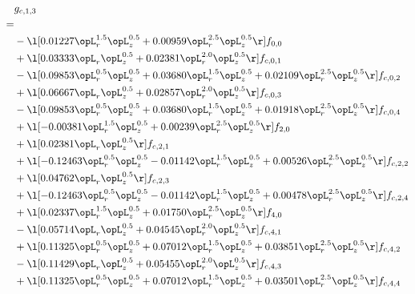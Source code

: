 \begin{alignat}{2} 
\label{eq:g_13_0} 
& g_{c,1,3} \nonumber \\ 
 = \\ 
& - \l[  0.01227 \opL_r^{1.5} \opL_z^{0.5} +  0.00959 \opL_r^{2.5} \opL_z^{0.5}  \r] f_{0,0} \nonumber \\ 
& + \l[  0.03333 \opL_r \opL_z^{0.5} +  0.02381 \opL_r^{2.0} \opL_z^{0.5}  \r] f_{c,0,1} \nonumber \\ 
& - \l[  0.09853 \opL_r^{0.5} \opL_z^{0.5} +  0.03680 \opL_r^{1.5} \opL_z^{0.5} +  0.02109 \opL_r^{2.5} \opL_z^{0.5}  \r] f_{c,0,2} \nonumber \\ 
& + \l[  0.06667 \opL_r \opL_z^{0.5} +  0.02857 \opL_r^{2.0} \opL_z^{0.5}  \r] f_{c,0,3} \nonumber \\ 
& - \l[  0.09853 \opL_r^{0.5} \opL_z^{0.5} +  0.03680 \opL_r^{1.5} \opL_z^{0.5} +  0.01918 \opL_r^{2.5} \opL_z^{0.5}  \r] f_{c,0,4} \nonumber \\ 
& + \l[  -0.00381 \opL_r^{1.5} \opL_z^{0.5} +  0.00239 \opL_r^{2.5} \opL_z^{0.5}  \r] f_{2,0} \nonumber \\ 
& + \l[  0.02381 \opL_r \opL_z^{0.5}  \r] f_{c,2,1} \nonumber \\ 
& + \l[  -0.12463 \opL_r^{0.5} \opL_z^{0.5}   -0.01142 \opL_r^{1.5} \opL_z^{0.5} +  0.00526 \opL_r^{2.5} \opL_z^{0.5}  \r] f_{c,2,2} \nonumber \\ 
& + \l[  0.04762 \opL_r \opL_z^{0.5}  \r] f_{c,2,3} \nonumber \\ 
& + \l[  -0.12463 \opL_r^{0.5} \opL_z^{0.5}   -0.01142 \opL_r^{1.5} \opL_z^{0.5} +  0.00478 \opL_r^{2.5} \opL_z^{0.5}  \r] f_{c,2,4} \nonumber \\ 
& + \l[  0.02337 \opL_r^{1.5} \opL_z^{0.5} +  0.01750 \opL_r^{2.5} \opL_z^{0.5}  \r] f_{4,0} \nonumber \\ 
& - \l[  0.05714 \opL_r \opL_z^{0.5} +  0.04545 \opL_r^{2.0} \opL_z^{0.5}  \r] f_{c,4,1} \nonumber \\ 
& + \l[  0.11325 \opL_r^{0.5} \opL_z^{0.5} +  0.07012 \opL_r^{1.5} \opL_z^{0.5} +  0.03851 \opL_r^{2.5} \opL_z^{0.5}  \r] f_{c,4,2} \nonumber \\ 
& - \l[  0.11429 \opL_r \opL_z^{0.5} +  0.05455 \opL_r^{2.0} \opL_z^{0.5}  \r] f_{c,4,3} \nonumber \\ 
& + \l[  0.11325 \opL_r^{0.5} \opL_z^{0.5} +  0.07012 \opL_r^{1.5} \opL_z^{0.5} +  0.03501 \opL_r^{2.5} \opL_z^{0.5}  \r] f_{c,4,4} \nonumber \\ 
\end{alignat} 


